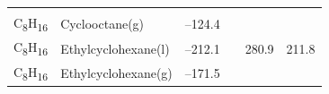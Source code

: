 \documentclass[
  9pt,
]{extbook}
\theoremstyle{definition}
\theoremstyle{definition}
\theoremstyle{definition}
\theoremstyle{remark}
\begin{document}
\begin{longtable}[]{@{}llllll@{}}
\begin{minipage}[t]{0.14\columnwidth}
\strut
\end{minipage}\tabularnewline
\begin{minipage}[t]{0.07\columnwidth}\raggedright
C\textsubscript{8}H\textsubscript{16}\strut
\end{minipage} & \begin{minipage}[t]{0.17\columnwidth}\raggedright
Cyclooctane(g)\strut
\end{minipage} & \begin{minipage}[t]{0.15\columnwidth}\raggedright
--124.4\strut
\end{minipage} & \begin{minipage}[t]{0.15\columnwidth}\raggedright
\strut
\end{minipage} & \begin{minipage}[t]{0.14\columnwidth}\raggedright
\strut
\end{minipage} & \begin{minipage}[t]{0.14\columnwidth}\raggedright
\strut
\end{minipage}\tabularnewline
\begin{minipage}[t]{0.07\columnwidth}\raggedright
C\textsubscript{8}H\textsubscript{16}\strut
\end{minipage} & \begin{minipage}[t]{0.17\columnwidth}\raggedright
Ethylcyclohexane(l)\strut
\end{minipage} & \begin{minipage}[t]{0.15\columnwidth}\raggedright
--212.1\strut
\end{minipage} & \begin{minipage}[t]{0.15\columnwidth}\raggedright
\strut
\end{minipage} & \begin{minipage}[t]{0.14\columnwidth}\raggedright
280.9\strut
\end{minipage} & \begin{minipage}[t]{0.14\columnwidth}\raggedright
211.8\strut
\end{minipage}\tabularnewline
\begin{minipage}[t]{0.07\columnwidth}\raggedright
C\textsubscript{8}H\textsubscript{16}\strut
\end{minipage} & \begin{minipage}[t]{0.17\columnwidth}\raggedright
Ethylcyclohexane(g)\strut
\end{minipage} & \begin{minipage}[t]{0.15\columnwidth}\raggedright
--171.5\strut
\end{minipage} & \begin{minipage}[t]{0.15\columnwidth}\raggedright

\end{minipage}
\end{longtable}
\end{document}
